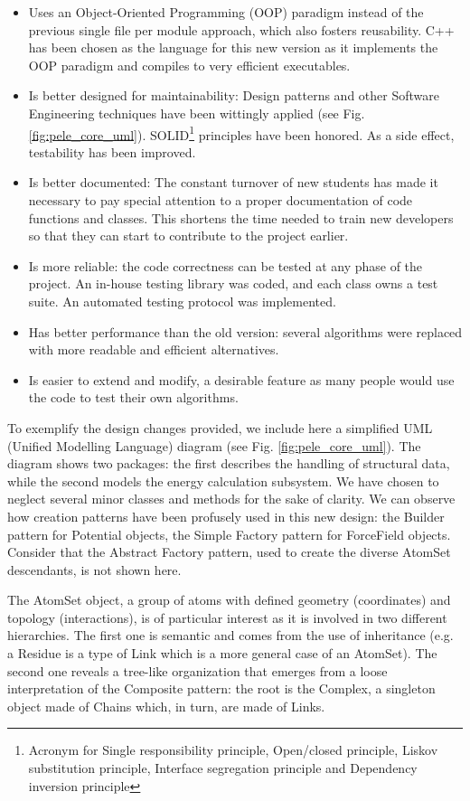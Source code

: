 \begin{itemize}
\item Uses an Object-Oriented Programming (OOP) paradigm instead of the previous single file per module approach, which also fosters
reusability. C++ has been chosen as the language for this new version as it implements the OOP paradigm and compiles to
very efficient executables.
\item Is better designed for maintainability: Design patterns and other Software Engineering techniques have been
wittingly applied (see Fig. \ref{fig:pele_core_uml}). SOLID\footnote{Acronym for Single responsibility principle,
Open/closed principle, Liskov substitution principle, Interface segregation principle and Dependency inversion
principle} principles have been honored. As a side effect, testability has been improved.
\item Is better documented: The constant turnover of new students has made it necessary to pay special attention to a proper
documentation of code functions and classes. This shortens the time needed to train new developers so that they can
start  to contribute to the project earlier. 
\item Is more reliable: the code correctness can be tested at any phase of the project. An in-house testing library was
coded, and each class owns a test suite. An automated testing protocol was implemented. 
\item Has better performance than the old version: several algorithms were replaced with more readable and efficient
alternatives.
\item Is easier to extend and modify, a desirable feature as many people would use the code to test their own algorithms.
\end{itemize}

To exemplify the design changes provided, we include here a simplified UML (Unified Modelling Language) diagram (see Fig.
\ref{fig:pele_core_uml}). The diagram shows two packages: the first describes the handling of structural
data, while the second models the energy calculation subsystem. We have chosen to neglect several minor classes and
methods for the sake of clarity. We can observe how creation patterns have been profusely used in this new design: the
Builder pattern for Potential objects, the Simple Factory pattern for ForceField objects. Consider that the
Abstract Factory pattern, used to create the diverse AtomSet descendants, is not shown here. 

The AtomSet object, a group of atoms with defined geometry (coordinates) and topology (interactions), is of particular interest as
it is involved in two different hierarchies. The first one is semantic and comes from the use of inheritance (e.g. a
Residue is a type of Link which is a more general case of an AtomSet). The second one reveals a tree-like organization
that emerges from a loose interpretation of the Composite pattern: the root is the Complex, a singleton object made of Chains which, in turn, are  made of Links. 

